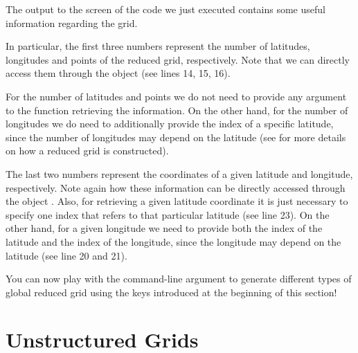 The output to the screen of the code we just executed 
contains some useful information regarding the grid.

In particular, the first three numbers represent the 
number of latitudes, longitudes and points of the reduced
grid, respectively. Note that we can directly access them 
through the  object (see lines 14, 15, 16).
\begin{tipbox}
For the number of latitudes and points we do not need to provide
any argument to the function retrieving the information. On the 
other hand, for the number of longitudes we do need to additionally 
provide the index of a specific latitude, since the number of 
longitudes may depend on the latitude (see  
for more details on how a reduced grid is constructed). 
\end{tipbox}

The last two numbers represent the coordinates of a given 
latitude and longitude, respectively. Note again how these 
information can be directly accessed through the object 
. 
Also, for retrieving a given latitude coordinate it is just 
necessary to specify one index that refers to that particular 
latitude (see line 23). On the other hand, for a given longitude 
we need to provide both the index of the latitude and the index 
of the longitude, since the longitude may depend on the latitude 
(see line 20 and 21).

You can now play with the command-line argument to generate 
different types of global reduced grid using the keys introduced 
at the beginning of this section!



\section{Unstructured Grids}